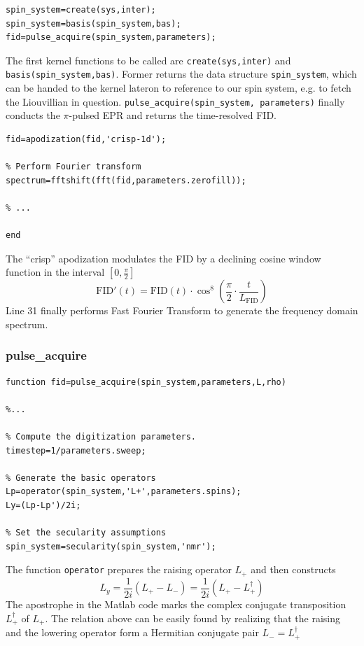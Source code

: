 \documentclass[11.5pt,a4paper]{article}
\begin{document}
\begin{lstlisting}[firstnumber=last]
% Run Spinach
spin_system=create(sys,inter);
spin_system=basis(spin_system,bas);
fid=pulse_acquire(spin_system,parameters);
\end{lstlisting}
The first kernel functions to be called are \verb$create(sys,inter)$ and \verb$basis(spin_system,bas)$. Former returns the data structure \verb$spin_system$, which can be handed to the kernel lateron to reference to our spin system, e.g. to fetch the Liouvillian in question.
\verb$pulse_acquire(spin_system, parameters)$ finally conducts the $\pi$-pulsed EPR and returns the time-resolved FID.
\begin{lstlisting}[firstnumber=last]
% Apodization
fid=apodization(fid,'crisp-1d');

% Perform Fourier transform
spectrum=fftshift(fft(fid,parameters.zerofill));

% ...

end
\end{lstlisting}
The ``crisp'' apodization modulates the FID by a declining cosine window function in the interval $[0,\tfrac{\pi}{2}]$
\begin{equation}
 \text{FID}'(t) = \text{FID}(t) \cdot \cos^8 \left( \frac{\pi}{2} \cdot \frac{t}{L_\text{FID}} \right)
\end{equation}
Line 31 finally performs Fast Fourier Transform to generate the frequency domain spectrum.

\subsubsection{pulse\_acquire}

\begin{lstlisting}
function fid=pulse_acquire(spin_system,parameters,L,rho)

%...

% Compute the digitization parameters.
timestep=1/parameters.sweep;

% Generate the basic operators
Lp=operator(spin_system,'L+',parameters.spins);
Ly=(Lp-Lp')/2i;

% Set the secularity assumptions
spin_system=secularity(spin_system,'nmr');
\end{lstlisting}
The function \verb$operator$ prepares the raising operator $L_+$ and then constructs
\begin{equation}
  L_y = \frac{1}{2i} ( L_+ - L_- ) = \frac{1}{2i} ( L_+ - L_+^\dagger )
\end{equation}
The apostrophe in the Matlab code marks the complex conjugate transposition $L_+^\dagger$ of $L_+$. The relation above can be easily found by realizing that the raising and the lowering operator form a Hermitian conjugate pair $L_- = L_+^\dagger$
\end{document}

